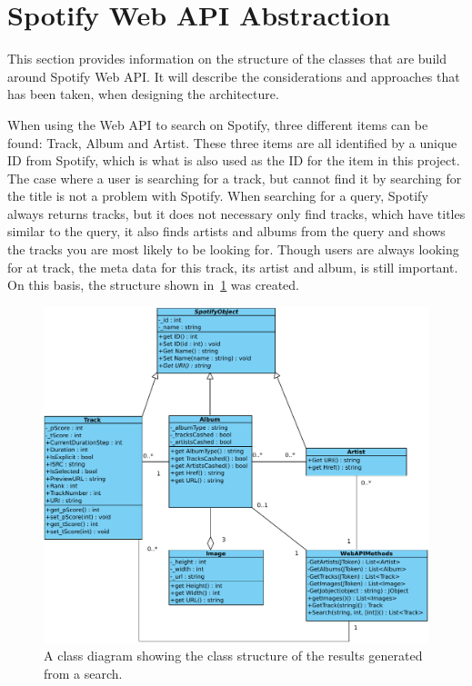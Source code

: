 \section{Spotify Web API Abstraction}
\label{imp:spotify_web_api}
This section provides information on the structure of the classes that are build around Spotify Web API. It will describe the considerations and approaches that has been taken, when designing the architecture.

When using the Web API to search on Spotify, three different items can be found: Track, Album and Artist. These three items are all identified by a unique ID from Spotify, which is what is also used as the ID for the item in this project. The case where a user is searching for a track, but cannot find it by searching for the title is not a problem with Spotify. When searching for a query, Spotify always returns tracks, but it does not necessary only find tracks, which have titles similar to the query, it also finds artists and albums from the query and shows the tracks you are most likely to be looking for. Though users are always looking for at track, the meta data for this track, its artist and album, is still important. On this basis, the structure shown in~\cref{fig:WebAPIUML} was created.

\begin{figure}[hbtp]
\centering
\includegraphics[width=1.2\textwidth]{Images/WebAPIUML}
\caption[Class structure of the results generated from a search.]{A class diagram showing the class structure of the results generated from a search.}
\label{fig:WebAPIUML}
\end{figure}

